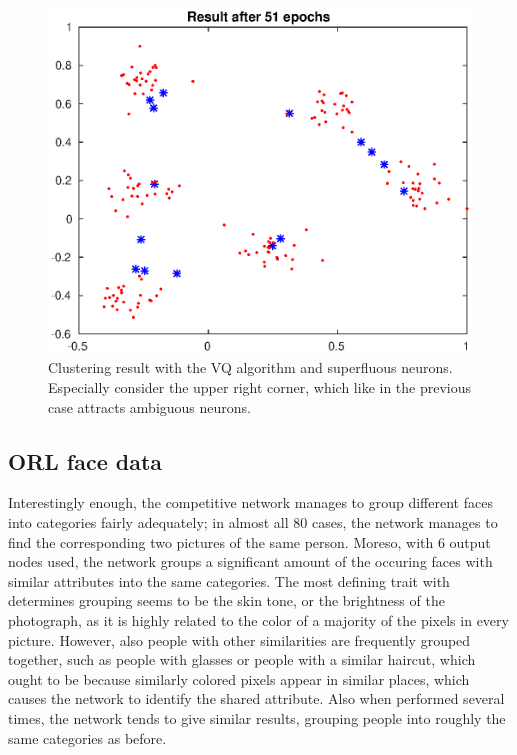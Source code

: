 \documentclass[a4paper,12pt]{article}
\theoremstyle{plain}
\theoremstyle{definition}
\begin{document}
      \begin{figure}[H]
         \centering
         \includegraphics[scale=.6]{3}
         \caption{Clustering result with the VQ algorithm and superfluous
         neurons. Especially consider the upper right corner, which like in the
         previous case attracts ambiguous neurons.}
         \label{fig:3}
      \end{figure}

      \subsection{ORL face data}
      Interestingly enough, the competitive network manages to group different
      faces into categories fairly adequately; in almost all 80 cases, the
      network manages to find the corresponding two pictures of the same person.
      Moreso, with 6 output nodes used, the network groups a significant amount of the
      occuring faces with similar attributes into the same categories. The most
      defining trait with determines grouping seems to be the skin tone, or the
      brightness of the photograph, as it is highly related to the color of a majority of
      the pixels in every picture. However, also people with other similarities are
      frequently grouped together, such as people with glasses or people with a
      similar haircut, which ought to be because similarly colored pixels appear
      in similar places, which causes the network to identify the shared
      attribute. Also when performed several times, the network tends to give
      similar results, grouping people into roughly the same categories as
      before. 
\end{document}
